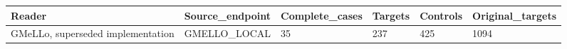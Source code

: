 \begin{tabular}{llllll}
Reader & Source\_endpoint & Complete\_cases & Targets & Controls & Original\_targets \\
\hline
GMeLLo, superseded implementation & GMELLO\_LOCAL & 35 & 237 & 425 & 1094 \\
\end{tabular}
